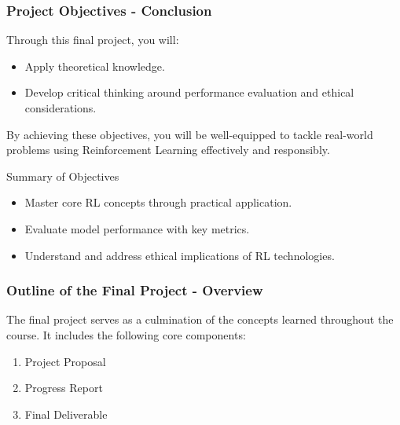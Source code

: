 \documentclass[aspectratio=169]{beamer}
\begin{document}
\begin{frame}[fragile]
    \frametitle{Project Objectives - Conclusion}
    Through this final project, you will:
    \begin{itemize}
        \item Apply theoretical knowledge.
        \item Develop critical thinking around performance evaluation and ethical considerations.
    \end{itemize}
    By achieving these objectives, you will be well-equipped to tackle real-world problems using Reinforcement Learning effectively and responsibly.

    \begin{block}{Summary of Objectives}
        \begin{itemize}
            \item Master core RL concepts through practical application.
            \item Evaluate model performance with key metrics.
            \item Understand and address ethical implications of RL technologies.
        \end{itemize}
    \end{block}
\end{frame}

\begin{frame}[fragile]
  \frametitle{Outline of the Final Project - Overview}
  The final project serves as a culmination of the concepts learned throughout the course. It includes the following core components:
  \begin{enumerate}
    \item Project Proposal
    \item Progress Report
    \item Final Deliverable
  \end{enumerate}
\end{frame}
\end{document}
